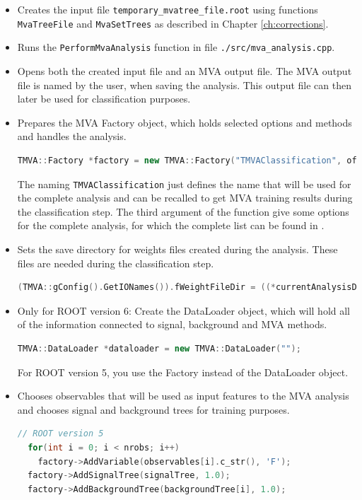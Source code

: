 \documentclass[12pt,a4paper]{report}
\begin{document}
\begin{itemize}
\item[1.] Creates the input file \texttt{temporary\_mvatree\_file.root} using functions \texttt{MvaTreeFile} and \texttt{MvaSetTrees} as described in Chapter \ref{ch:corrections}.
\item[2.] Runs the \texttt{PerformMvaAnalysis} function in file \texttt{./src/mva\_analysis.cpp}.
\item[3.] Opens both the created input file and an MVA output file. The MVA output file is named by the user, when saving the analysis. This output file can then later be used for classification purposes.
\item[4.] Prepares the MVA Factory object, which holds selected options and methods and handles the analysis. 
\begin{lstlisting}[language=C++]
  TMVA::Factory *factory = new TMVA::Factory("TMVAClassification", ofile, "!V:!Silent:Color:DrawProgressBar:Transformations=I;D;P;G;D:AnalysisType=Classification");
\end{lstlisting}
The naming \texttt{TMVAClassification} just defines the name that will be used for the complete analysis and can be recalled to get MVA training results during the classification step. The third argument of the function give some options for the complete analysis, for which the complete list can be found in \cite{tmvadocument}.
\item[5.] Sets the save directory for weights files created during the analysis. These files are needed during the classification step.
\begin{lstlisting}[language=C++]
  (TMVA::gConfig().GetIONames()).fWeightFileDir = ((*currentAnalysisDir) + "/weights").c_str();
\end{lstlisting}
\item[6.] Only for ROOT version 6: Create the DataLoader object, which will hold all of the information connected to signal, background and MVA methods.
\begin{lstlisting}[language=C++]
  TMVA::DataLoader *dataloader = new TMVA::DataLoader("");
\end{lstlisting}
For ROOT version 5, you use the Factory instead of the DataLoader object.
\item[7.] Chooses observables that will be used as input features to the MVA analysis and chooses signal and background trees for training purposes.
\begin{lstlisting}[language=C++]
  // ROOT version 5
  for(int i = 0; i < nrobs; i++)
    factory->AddVariable(observables[i].c_str(), 'F');
  factory->AddSignalTree(signalTree, 1.0);
  factory->AddBackgroundTree(backgroundTree[i], 1.0);


\end{lstlisting}
\end{itemize}
\end{document}

